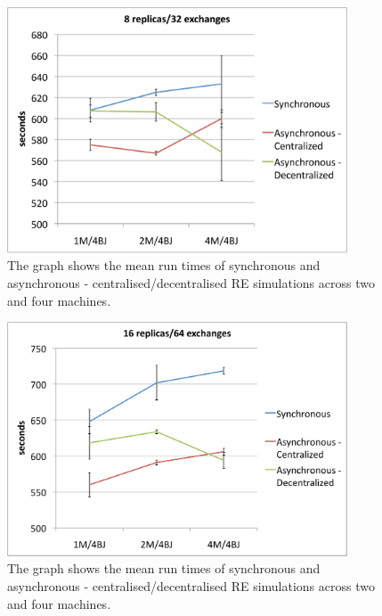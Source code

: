 \documentclass{rspublic}
\begin{document}
%
\begin{figure}
\centering
\includegraphics[width=0.9\textwidth]{../data/8rep.pdf}
\caption{\small The graph shows the mean run times of synchronous and
  asynchronous - centralised/decentralised RE simulations across two
  and four machines.}
\label{fig:2machines}
\vspace{-1em}
\end{figure}

\begin{figure}
\centering
\includegraphics[width=0.9\textwidth]{../data/16rep.pdf}
\caption{\small The graph shows the mean run times of synchronous and
  asynchronous - centralised/decentralised RE simulations across two
  and four machines.}
\label{fig:2machines}
\vspace{-1em}
\end{figure}
\end{document}
